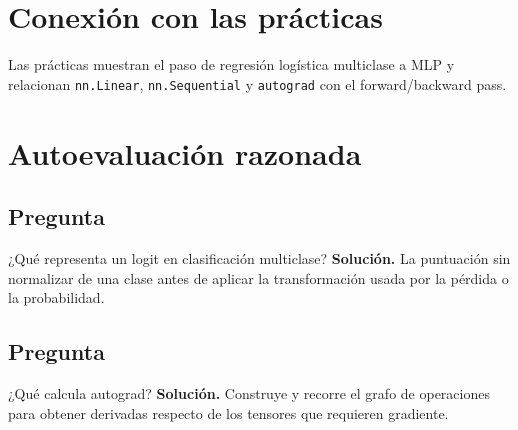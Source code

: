 \section{Conexión con las prácticas}

Las prácticas muestran el paso de regresión logística multiclase a MLP y relacionan \texttt{nn.Linear}, \texttt{nn.Sequential} y \texttt{autograd} con el forward/backward pass.


\section{Autoevaluación razonada}

\subsection*{Pregunta} ¿Qué representa un logit en clasificación multiclase?
\textbf{Solución.} La puntuación sin normalizar de una clase antes de aplicar la transformación usada por la pérdida o la probabilidad.

\subsection*{Pregunta} ¿Qué calcula autograd?
\textbf{Solución.} Construye y recorre el grafo de operaciones para obtener derivadas respecto de los tensores que requieren gradiente.
